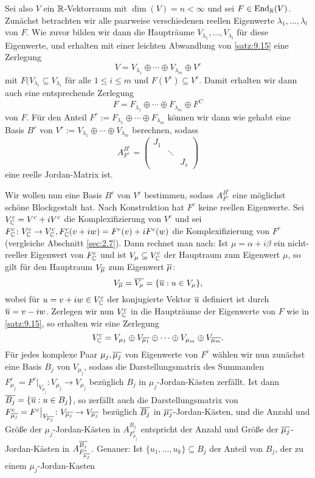 Sei also $V$ ein $\mathbb{R}$-Vektorraum mit $\dim(V) = n < \infty$ und sei $F \in \operatorname{End}_{\mathbb{R}}(V)$.
Zunächst betrachten wir alle paarweise verschiedenen reellen Eigenwerte $\lambda_1,\dots,\lambda_l$ von $F$.
Wie zuvor bilden wir dann die Haupträume $V_{\lambda_1},\dots,V_{\lambda_l}$ für diese Eigenwerte, und erhalten mit einer leichten Abwandlung von \autoref{satz:9.15} eine Zerlegung
\[
	V = V_{\lambda_1} \oplus \cdots \oplus V_{\lambda_m} \oplus V^c
\]
mit $F(V_{\lambda_i} \subseteq V_{\lambda_i}$ für alle $1 \leq i \leq m$ und $F(V^c) \subseteq V^c$.
Damit erhalten wir dann auch eine entsprechende Zerlegung
\[
	F = F_{\lambda_1} \oplus \cdots \oplus F_{\lambda_m} \oplus F^C
\]
von $F$.
Für den Anteil $F^r := F_{\lambda_1} \oplus \cdots \oplus F_{\lambda_m}$ können wir dann wie gehabt eine Basis $B^r$ von $V^r := V_{\lambda_1} \oplus \cdots \oplus V_{\lambda_m}$ berechnen, sodass
\[
	A_{F^r}^{B^r} = \begin{pmatrix}
		J_1 &        &  \\
		    & \ddots &  \\
		    &        & J_s
	\end{pmatrix}
\]
eine reelle Jordan-Matrix ist.

Wir wollen nun eine Basis $B^c$ von $V^c$ bestimmen, sodass $A_{F^c}^{B^c}$ eine möglichst schöne Blockgestalt hat.
Nach Konstruktion hat $F^c$ keine reellen Eigenwerte.
Sei $V_{\mathbb{C}}^c = V^c + iV^c$ die Komplexifizierung von $V^c$ und sei $F_{\mathbb{C}}^c \colon V_{\mathbb{C}}^c \rightarrow V_{\mathbb{C}}^c, F_{\mathbb{C}}^c(v+iw) = F^c(v) + iF^c(w)$ die Komplexifizierung von $F^c$ (vergleiche Abschnitt \ref{sec:2.7}).
Dann rechnet man nach:
Ist $\mu = \alpha + i \beta$ ein nicht-reeller Eigenwert von $F_{\mathbb{C}}^c$ und ist $V_\mu \subseteq V_{\mathbb{C}}^c$ der Hauptraum zum Eigenwert $\mu$, so gilt für den Hauptraum $V_{\overline{\mu}}$ zum Eigenwert $\overline{\mu}$:
\[
	V_{\overline{\mu}} = \overline{V_\mu} = \{ \overline{u} : u \in V_{\mu}\},
\]
wobei für $u = v + iw \in V_{\mathbb{C}}^c$ der konjugierte Vektor $\overline{u}$ definiert ist durch $\overline{u} = v-iw$.
Zerlegen wir nun $V_{\mathbb{C}}^c$ in die Haupträume der Eigenwerte von $F$ wie in \autoref{satz:9.15}, so erhalten wir eine Zerlegung
\[
	V_{\mathbb{C}}^c = V_{\mu_1} \oplus V_{\overline{\mu_1}} \oplus \cdots \oplus V_{\mu_m} \oplus V_{\overline{\mu_m}}.
\]
Für jedes komplexe Paar $\mu_j, \overline{\mu_j}$ von Eigenwerte von $F^c$ wählen wir nun zunächst eine Basis $B_j$ von $V_{\mu_j}$, sodass die Darstellungsmatrix des Summanden $F_{\mu_j}^c = F^c \big|_{V_{\mu_j}} \colon V_{\mu_j} \rightarrow V_{\mu_j}$ bezüglich $B_j$ in $\mu_j$-Jordan-Kästen zerfällt.
Ist dann $\overline{B_j} = \{\overline{u} : u \in B_j\}$, so zerfällt auch die Darstellungsmatrix von $F^c_{\overline{\mu_j}} = F^c \big|_{V_{\overline{\mu_j}}} \colon V_{\overline{\mu_j}} \rightarrow V_{\overline{\mu_j}}$ bezüglich $\overline{B_j}$ in $\overline{\mu_j}$-Jordan-Kästen, und die Anzahl und Größe der $\mu_j$-Jordan-Kästen in $A_{F_{\mu_j}^c}^{B_j}$ entspricht der Anzahl und Größe der $\overline{\mu_j}$-Jordan-Kästen in $A_{F_{\overline{\mu_j}}^c}^{\overline{B_j}}$.
Genauer: Ist $\{u_1,\dots,u_k\} \subseteq B_j$ der Anteil von $B_j$, der zu einem $\mu_j$-Jordan-Kasten

